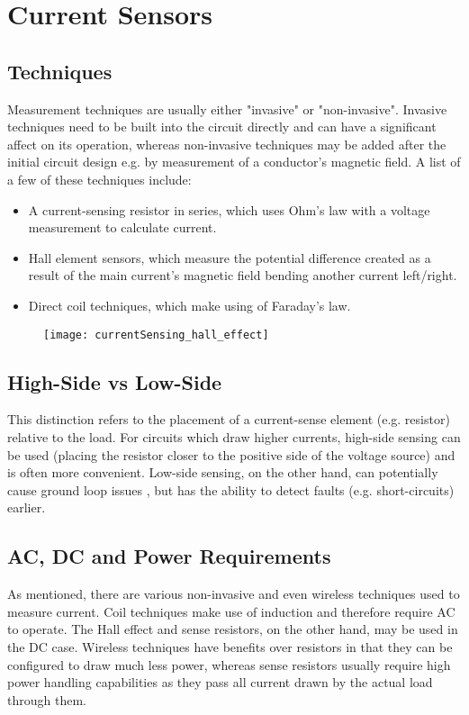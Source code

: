 \graphicspath{{content/1_literatureReview/figures/}}
\section{Current Sensors}

\subsection{Techniques}
Measurement techniques are usually either "invasive" or "non-invasive". Invasive techniques need to be built into the circuit directly and can have a significant affect
on its operation, whereas non-invasive techniques may be added after the initial circuit design e.g. by measurement of a conductor's magnetic field.
A list of a few of these techniques \cite{currentSenseMethods} include:
\begin{itemize}
    \item A current-sensing resistor in series, which uses Ohm's law with a voltage measurement to calculate current.
    \item Hall element sensors, which measure the potential difference created as a result of the main current's magnetic field bending another current left/right.
    \item Direct coil techniques, which make using of Faraday's law.
\end{itemize}

\begin{figure}[h!]
    \centering
    \texttt{[image: currentSensing\_hall\_effect]}
    \label{fig:hall-effect}
  \end{figure}

\subsection{High-Side vs Low-Side}
This distinction refers to the placement of a current-sense element (e.g. resistor) relative to the load. For circuits which draw higher currents, high-side sensing can be used
(placing the resistor closer to the positive side of the voltage source) and is often more convenient. Low-side sensing, on the other hand, can potentially cause ground loop
issues \cite{currentSenseLowHighSide}, but has the ability to detect faults (e.g. short-circuits) earlier.

\subsection{AC, DC and Power Requirements}
As mentioned, there are various non-invasive and even wireless techniques used to measure current. Coil techniques make use of induction and therefore require AC to operate.
The Hall effect and sense resistors, on the other hand, may be used in the DC case. Wireless techniques have benefits over resistors in that they can be configured to draw much less power,
whereas sense resistors usually require high power handling capabilities as they pass all current drawn by the actual load through them.
